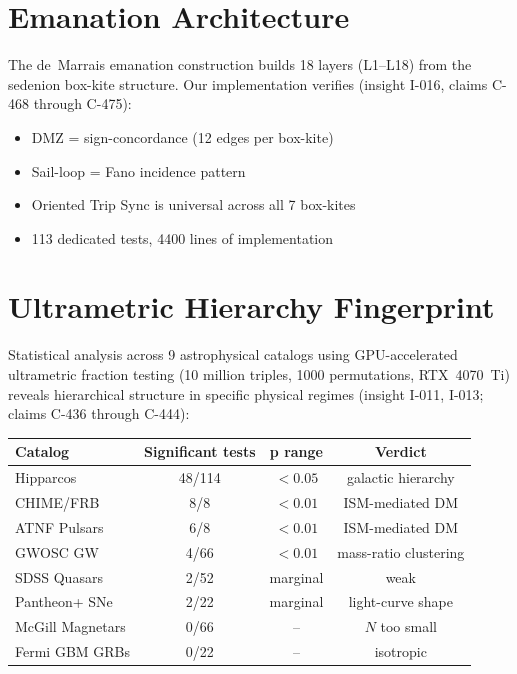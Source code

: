 \documentclass{article}
\theoremstyle{definition}
\theoremstyle{plain}
\theoremstyle{remark}
\begin{document}
\section{Emanation Architecture}
\label{sec:emanation}

The de~Marrais emanation construction \cite{demarrais2006} builds 18 layers
(L1--L18) from the sedenion box-kite structure.  Our implementation verifies
(insight I-016, claims C-468 through C-475):

\begin{itemize}
  \item DMZ = sign-concordance (12 edges per box-kite)
  \item Sail-loop = Fano incidence pattern
  \item Oriented Trip Sync is universal across all 7 box-kites
  \item 113 dedicated tests, 4400 lines of implementation
\end{itemize}

\section{Ultrametric Hierarchy Fingerprint}
\label{sec:ultrametric}

Statistical analysis across 9 astrophysical catalogs using GPU-accelerated
ultrametric fraction testing (10 million triples, 1000 permutations, RTX~4070~Ti)
reveals hierarchical structure in specific physical regimes
(insight I-011, I-013; claims C-436 through C-444):

\begin{center}
\begin{tabular}{lccc}
\hline
\textbf{Catalog} & \textbf{Significant tests} & \textbf{p range} & \textbf{Verdict} \\
\hline
Hipparcos & 48/114 & $< 0.05$ & galactic hierarchy \\
CHIME/FRB & 8/8 & $< 0.01$ & ISM-mediated DM \\
ATNF Pulsars & 6/8 & $< 0.01$ & ISM-mediated DM \\
GWOSC GW & 4/66 & $< 0.01$ & mass-ratio clustering \\
SDSS Quasars & 2/52 & marginal & weak \\
Pantheon+ SNe & 2/22 & marginal & light-curve shape \\
McGill Magnetars & 0/66 & -- & $N$ too small \\
Fermi GBM GRBs & 0/22 & -- & isotropic \\
\hline
\end{tabular}
\end{center}
\end{document}
